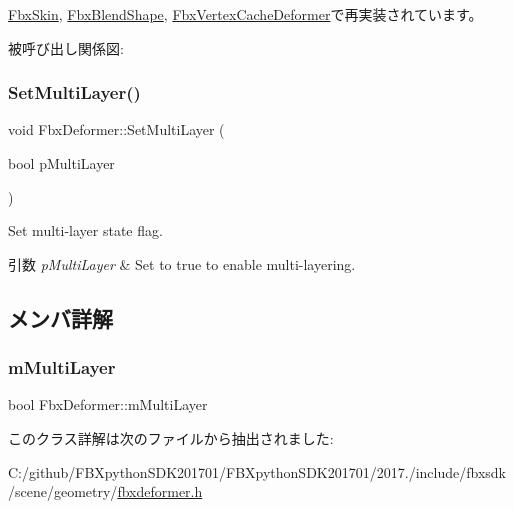 \hyperlink{class_fbx_skin_a736228a80b5d0db0075527767286be2d}{Fbx\+Skin}, \hyperlink{class_fbx_blend_shape_aa2b22b70c929ac1ad39b12f0ade998d1}{Fbx\+Blend\+Shape}, \hyperlink{class_fbx_vertex_cache_deformer_a67322e24180497b1f268cad5ed29c08b}{Fbx\+Vertex\+Cache\+Deformer}で再実装されています。

被呼び出し関係図\+:
\mbox{\label{class_fbx_deformer_ac1152e69487365faa19fe23ffde19f85}} 
\subsubsection{\texorpdfstring{Set\+Multi\+Layer()}{SetMultiLayer()}}
{\footnotesize\ttfamily void Fbx\+Deformer\+::\+Set\+Multi\+Layer (\begin{DoxyParamCaption}\item[{bool}]{p\+Multi\+Layer }\end{DoxyParamCaption})}

Set multi-\/layer state flag. 
\begin{DoxyParams}{引数}
{\em p\+Multi\+Layer} & Set to {\ttfamily true} to enable multi-\/layering. \\
\hline
\end{DoxyParams}


\subsection{メンバ詳解}
\mbox{\label{class_fbx_deformer_ac570aba2e0282a6075831422a05c2d48}} 
\subsubsection{\texorpdfstring{m\+Multi\+Layer}{mMultiLayer}}
{\footnotesize\ttfamily bool Fbx\+Deformer\+::m\+Multi\+Layer\hspace{0.3cm}{\ttfamily [protected]}}



このクラス詳解は次のファイルから抽出されました\+:\begin{DoxyCompactItemize}
\item 
C\+:/github/\+F\+B\+Xpython\+S\+D\+K201701/\+F\+B\+Xpython\+S\+D\+K201701/2017./include/fbxsdk/scene/geometry/\hyperlink{fbxdeformer_8h}{fbxdeformer.\+h}\end{DoxyCompactItemize}
